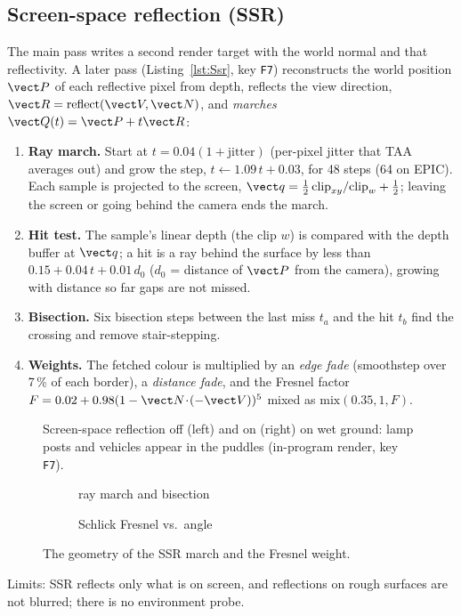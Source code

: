 \subsection{Screen-space reflection (SSR)}
The main pass writes a second render target with the world normal and that reflectivity. A later pass (Listing~\ref{lst:Ssr}, key \texttt{F7}) reconstructs the world position $\vect P$ of each reflective pixel from depth, reflects the view direction, $\vect R=\mathrm{reflect}(\vect V,\vect N)$, and \emph{marches} $\vect Q(t)=\vect P+t\vect R$:
\begin{enumerate}
  \item \textbf{Ray march.} Start at $t=0.04(1+\text{jitter})$ (per-pixel jitter that TAA averages out) and grow the step, $t\leftarrow1.09\,t+0.03$, for 48 steps (64 on EPIC). Each sample is projected to the screen, $\vect q=\tfrac12\,\text{clip}_{xy}/\text{clip}_w+\tfrac12$;
  leaving the screen or going behind the camera ends the march.
  \item \textbf{Hit test.} The sample's linear depth (the clip $w$) is compared with the depth buffer at $\vect q$; a hit is a ray behind the surface by less than $0.15+0.04\,t+0.01\,d_0$ ($d_0$ = distance of $\vect P$ from the camera), growing with distance so far gaps are not missed.
  \item \textbf{Bisection.} Six bisection steps between the last miss $t_a$ and the hit $t_b$ find the crossing and remove stair-stepping.
  \item \textbf{Weights.} The fetched colour is multiplied by an \emph{edge fade} (smoothstep over 7\,\% of each border), a \emph{distance fade}, and the Fresnel factor
  $F=0.02+0.98(1-\vect N\!\cdot\!(-\vect V))^5$ mixed as $\mathrm{mix}(0.35,1,F)$.
\end{enumerate}
\lstSsr
\begin{figure}[h]
\centering
{}
\caption{Screen-space reflection off (left) and on (right) on wet ground: lamp posts and vehicles appear in the puddles (in-program render, key \texttt{F7}).}
\end{figure}
\begin{figure}[h]
\centering
\begin{subfigure}{0.48\linewidth}\caption{ray march and bisection}\end{subfigure}
\begin{subfigure}{0.48\linewidth}\caption{Schlick Fresnel vs.\ angle}\end{subfigure}
\caption{The geometry of the SSR march and the Fresnel weight.}
\end{figure}
Limits: SSR reflects only what is on screen, and reflections on rough surfaces are not blurred; there is no environment probe.

